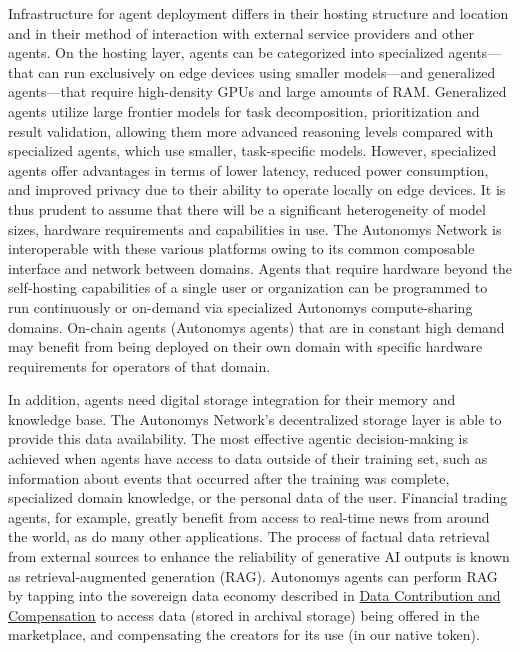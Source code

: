 \documentclass[conference]{IEEEtran}
\begin{document}
Infrastructure for agent deployment differs in their hosting structure and location and in their method of interaction with external service providers and other agents. On the hosting layer, agents can be categorized into specialized agents—that can run exclusively on edge devices using smaller models—and generalized agents—that require high-density GPUs and large amounts of RAM. Generalized agents utilize large frontier models for task decomposition, prioritization and result validation, allowing them more advanced reasoning levels compared with specialized agents, which use smaller, task-specific models. However, specialized agents offer advantages in terms of lower latency, reduced power consumption, and improved privacy due to their ability to operate locally on edge devices. It is thus prudent to assume that there will be a significant heterogeneity of model sizes, hardware requirements and capabilities in use. The Autonomys Network is interoperable with these various platforms owing to its common composable interface and network between domains. Agents that require hardware beyond the self-hosting capabilities of a single user or organization can be programmed to run continuously or on-demand via specialized Autonomys compute-sharing domains. On-chain agents (Autonomys agents) that are in constant high demand may benefit from being deployed on their own domain with specific hardware requirements for operators of that domain.

In addition, agents need digital storage integration for their memory and knowledge base. The Autonomys Network's decentralized storage layer is able to provide this data availability. The most effective agentic decision-making is achieved when agents have access to data outside of their training set, such as information about events that occurred after the training was complete, specialized domain knowledge, or the personal data of the user. Financial trading agents, for example, greatly benefit from access to real-time news from around the world, as do many other applications. The process of factual data retrieval from external sources to enhance the reliability of generative AI outputs is known as retrieval-augmented generation (RAG). Autonomys agents can perform RAG by tapping into the sovereign data economy described in \hyperref[sec:datacomp]{Data Contribution and Compensation} to access data (stored in archival storage) being offered in the marketplace, and compensating the creators for its use (in our native token).
\end{document}
